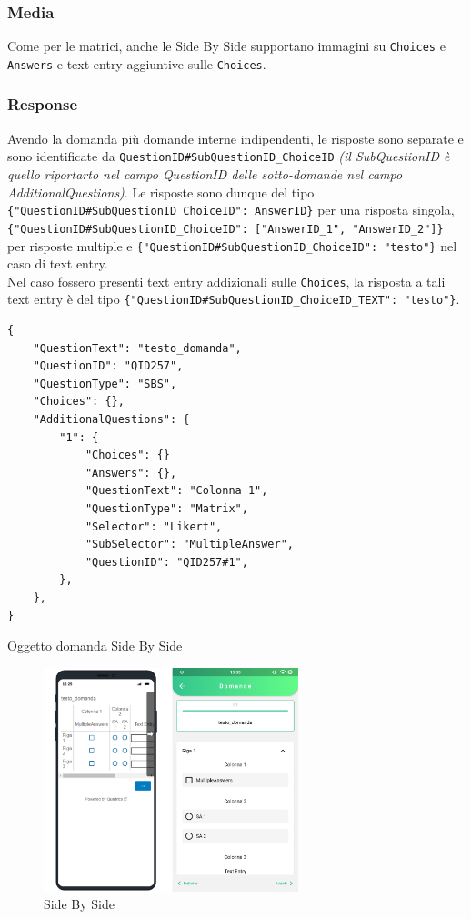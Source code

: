 \subsubsection{Media}
Come per le matrici, anche le Side By Side supportano immagini su \texttt{Choices} e \texttt{Answers} e text entry aggiuntive sulle \texttt{Choices}.

\subsubsection{Response}
Avendo la domanda più domande interne indipendenti, le risposte sono separate e sono identificate da \texttt{QuestionID\#SubQuestionID\_ChoiceID} \textit{(il SubQuestionID è quello riportarto nel campo QuestionID delle sotto-domande nel campo AdditionalQuestions)}. Le risposte sono dunque del tipo\\ \texttt{\{"QuestionID\#SubQuestionID\_ChoiceID": AnswerID\}} per una risposta singola, \texttt{\{"QuestionID\#SubQuestionID\_ChoiceID": ["AnswerID\_1", "AnswerID\_2"]\}}\\ per risposte multiple e \texttt{\{"QuestionID\#SubQuestionID\_ChoiceID": "testo"\}} nel caso di text entry. \\
Nel caso fossero presenti text entry addizionali sulle \texttt{Choices}, la risposta a tali text entry è del tipo \texttt{\{"QuestionID\#SubQuestionID\_ChoiceID\_TEXT": "testo"\}}.

\newpage
\begin{json}
\begin{verbatim}
{
    "QuestionText": "testo_domanda",
    "QuestionID": "QID257",
    "QuestionType": "SBS",
    "Choices": {},
    "AdditionalQuestions": {
        "1": {
            "Choices": {}
            "Answers": {},
            "QuestionText": "Colonna 1",
            "QuestionType": "Matrix",
            "Selector": "Likert",
            "SubSelector": "MultipleAnswer",
            "QuestionID": "QID257#1",
        },
    },
}
\end{verbatim}
\caption{Oggetto domanda Side By Side}
\label{json:sbs}
\end{json}

\begin{figure}[h!]
\centering
\includegraphics[width=0.66\textwidth]{img/sbs}
\caption{Side By Side}
\label{fig:sbs}
\end{figure}

